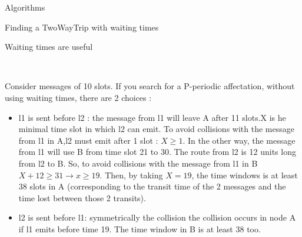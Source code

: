 \documentclass[a4paper,10pt]{report}
\begin{document}
\begin{chapter}{Algorithms}
\begin{section}{Finding a TwoWayTrip with waiting times}
\begin{subsection}{Waiting times are useful}
\begin{center}
{{{
  }}}\\
\end{center}

Consider messages of 10 slots. If you search for a P-periodic affectation, without using waiting times, there are 2 choices : 
\begin{itemize}
 \item l1 is sent before l2 : the message from l1 will leave A after 11 slots.X is he minimal time slot in which l2 can emit. 
 To avoid collisions with the message from l1 in A,l2 must emit after 1 slot :  $X\ge1$.
 In the other way, the message from l1 will use B from time slot 21 to 30. The route from l2 is 12 units long from l2 to B. So, to avoid collisions with 
 the message from l1 in B $X+12 \ge 31 \rightarrow x\ge 19$. Then, by taking $X=19$, the time
 windows is at least 38 slots in A (corresponding to the transit time of the 2 messages and the time lost between those 2 transits).
 \item l2 is sent before l1: symmetrically the collision the collision occurs in node A if l1 emits before time 19. The time window in B is at least 38 too.
\end{itemize}

\end{subsection}
\end{section}
\end{chapter}
\end{document}
